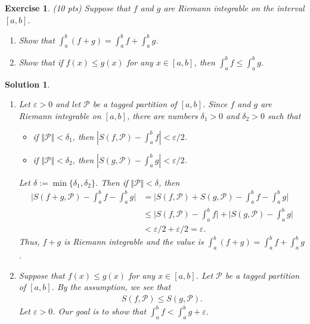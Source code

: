 \documentclass[12pt]{article}
\newcommand{\cP}{\mathcal{P}}
\theoremstyle{plain}
\newtheorem{exer}{\textbf{Exercise}}}
\theoremstyle{plain}
\newtheorem*{sol}{\textbf{Solution}}}
\theoremstyle{plain}
\theoremstyle{plain}
\begin{document}
\begin{exer}
(10 pts)
Suppose that $f$ and $g$ are Riemann integrable on the interval $[a, b]$.
	\begin{enumerate}[label=\textbf{\alph*)}]
	\item Show that $\int_a^b (f + g) = \int_a^b f + \int_a^b g$.
	\item Show that if $f(x) \leq g(x)$ for any $x \in [a, b]$, then $\int_a^b f \leq \int_a^b g$.
	\end{enumerate}
\end{exer}
\begin{sol}
\begin{enumerate}[label=\textbf{\alph*)}]
\item Let $\varepsilon > 0$ and let $\cP$ be a tagged partition of $[a, b]$. Since $f$ and $g$ are Riemann integrable on $[a, b]$, there are numbers $\delta_1 > 0$ and $\delta_2 > 0$ such that
	\begin{itemize}
	\item if $\Vert \cP \Vert < \delta_1$, then $|S (f , \cP ) - \int_a^b f | < \varepsilon/2$.
	\item if $\Vert \cP \Vert < \delta_2$, then $|S (g, \cP ) - \int_a^b g| < \varepsilon/2$.
	\end{itemize}
Let $\delta := \min \{ \delta_1 , \delta_2 \}$. Then if $\Vert \cP \Vert < \delta$, then
	\begin{align*}
	\Big| S (f + g , \cP ) - \int_a^b f - \int_a^b g \Big| &= \Big| S (f, \cP ) + S (g , \cP ) - \int_a^b f - \int_a^b g \Big| \\
	& \leq \Big| S (f , \cP ) - \int_a^b f \Big| + \Big| S (g , \cP ) - \int_a^b g \Big| \\
	& < \varepsilon/2 + \varepsilon/2 = \varepsilon .
	\end{align*}
	Thus, $f + g$ is Riemann integrable and the value is $\int_a^b (f + g) = \int_a^b f + \int_a^b g$.
\item Suppose that $f(x) \leq g(x)$ for any $x \in [a, b]$. Let $\cP$ be a tagged partition of $[a, b]$. By the assumption, we see that
	\begin{align*}
	S (f, \cP ) \leq S (g, \cP ) .
	\end{align*}
Let $\varepsilon > 0$. Our goal is to show that $\int_a^b f < \int_a^b g + \varepsilon$.


\end{enumerate}
\end{sol}
\end{document}
